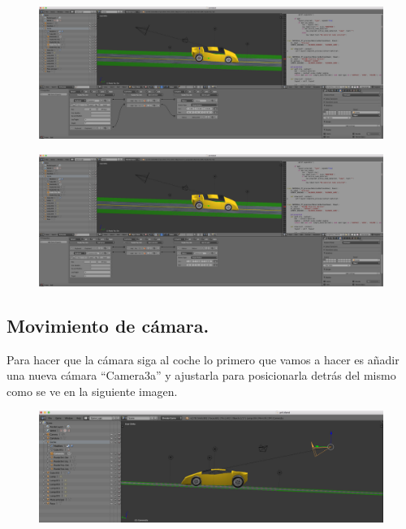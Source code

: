 \documentclass[10pt]{article}
\begin{document}
\begin{figure}[H]
	\begin{center}
	 		\includegraphics[width = 1.00\textwidth]{Imagenes/p4-img11}
	\end{center} 
\end{figure}

\begin{figure}[H]
	\begin{center}
	 		\includegraphics[width = 1.00\textwidth]{Imagenes/p4-img12}
	\end{center} 
\end{figure}



\subsection{Movimiento de cámara.}
Para hacer que la cámara siga al coche lo primero que vamos a hacer es añadir una nueva cámara ``Camera3a'' y ajustarla para posicionarla detrás del mismo como se ve en la siguiente imagen. \\

\begin{figure}[H]
	\begin{center}
	 		\includegraphics[width = 1.00\textwidth]{Imagenes/p4-img13}
	\end{center} 
\end{figure}
\end{document}
